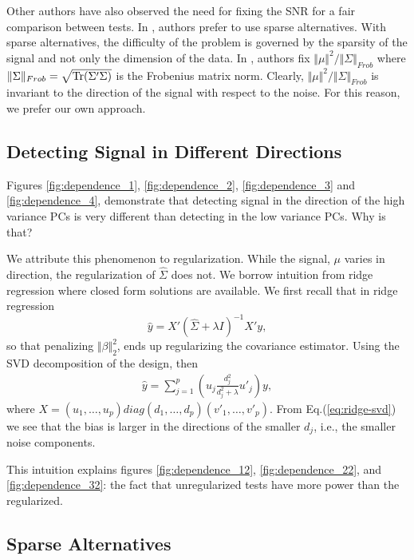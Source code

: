 \documentclass[journal]{IEEEtran}
\begin{document}
Other authors have also observed the need for fixing the SNR for a fair comparison between tests.
In \cite{ramdas2015decreasing}, authors prefer to use sparse alternatives.
With sparse alternatives, the difficulty of the problem is governed by the sparsity of the signal and not only the dimension of the data. 
In \cite{chen2010two}, authors fix $\Vert \mu \Vert^2/\Vert \Sigma \Vert_{Frob}$ where $\Vert \Sigma \Vert_{Frob}=\sqrt{\operatorname{Tr}(\Sigma'\Sigma)}$ is the Frobenius matrix norm. 
Clearly, $\Vert \mu \Vert^2/\Vert \Sigma \Vert_{Frob}$ is invariant to the direction of the signal with respect to the noise. 
For this reason, we prefer our own approach.






\subsection{Detecting Signal in Different Directions}
Figures \ref{fig:dependence_1}, \ref{fig:dependence_2}, \ref{fig:dependence_3} and \ref{fig:dependence_4}, demonstrate that detecting signal in the direction of the high variance PCs is very different than detecting in the low variance PCs.
Why is that?

We attribute this phenomenon to regularization.
While the signal, $\mu$ varies in direction, the regularization of $\hat \Sigma$ does not. 
We borrow intuition from ridge regression where closed form solutions are available. 
We first recall that in ridge regression 
$$\hat y = X'(\hat \Sigma +\lambda I)^{-1}X'y,$$
so that penalizing $\Vert \beta \Vert_2^2$, ends up regularizing the covariance estimator.
Using the SVD decomposition of the design, then 
\begin{align}
\label{eq:ridge-svd}
	\hat y= \sum_{j=1}^p \left( u_j \frac{d_j^2}{d_j^2+\lambda}u'_j \right)y,
\end{align}
where
$X=(u_1,\dots,u_p)diag(d_1,\dots,d_p)(v'_1,\dots,v'_p)$.
From Eq.(\ref{eq:ridge-svd}) we see that the bias is larger in the directions of the smaller $d_j$, i.e., the smaller noise components. 

This intuition explains figures \ref{fig:dependence_12}, \ref{fig:dependence_22}, and \ref{fig:dependence_32}: the fact that unregularized tests have more power than the regularized. 


\subsection{Sparse Alternatives}
\label{sec:sparse}
\end{document}
